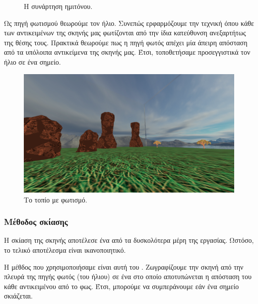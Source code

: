 \documentclass[11pt]{scrartcl} %
\newenvironment{centerimg}[1]%
{%
    \begin{figure}[H]
        #1
    \begin{center}
}%
{%
    \end{center}
    \end{figure}
}
\begin{document}
\begin{figure}[H]
    \begin{center}
        \caption{Η συνάρτηση ημιτόνου.}
        \end{center}
\end{figure}

Ως πηγή φωτισμού θεωρούμε τον ήλιο. Συνεπώς ερφαρμόζουμε την τεχνική  όπου 
κάθε  των αντικειμένων της σκηνής μας φωτίζονται από την ίδια κατεύθυνση ανεξαρτήτως της θέσης τους.
Πρακτικά θεωρούμε πως η πηγή φωτός απέχει μία άπειρη απόσταση από τα υπόλοιπα αντικείμενα της σκηνής μας.
Έτσι, τοποθετήσαμε προσεγγιστικά τον ήλιο σε ένα  σημείο. 

\begin{centerimg}{\caption{Το τοπίο με φωτισμό.}}
    \includegraphics[width=.7/textwidth]{./assets/lighting.png}
\end{centerimg}

\subsubsection{Μέθοδος σκίασης}

Η σκίαση της σκηνής αποτέλεσε ένα από τα δυσκολότερα μέρη της εργασίας. Ωστόσο, το τελικό αποτέλεσμα 
είναι ικανοποιητικό. 

Η μέθδος που χρησιμοποιήσαμε είναι αυτή του . Ζωγραφίζουμε την σκηνή από την πλευρά 
της πηγής φωτός (του ήλιου) σε ένα  στο οποίο αποτυπώνεται η απόσταση του κάθε αντικειμένου 
από το φως. Έτσι, μπορούμε να συμπεράνουμε εάν ένα σημείο σκιάζεται. 
\end{document}
